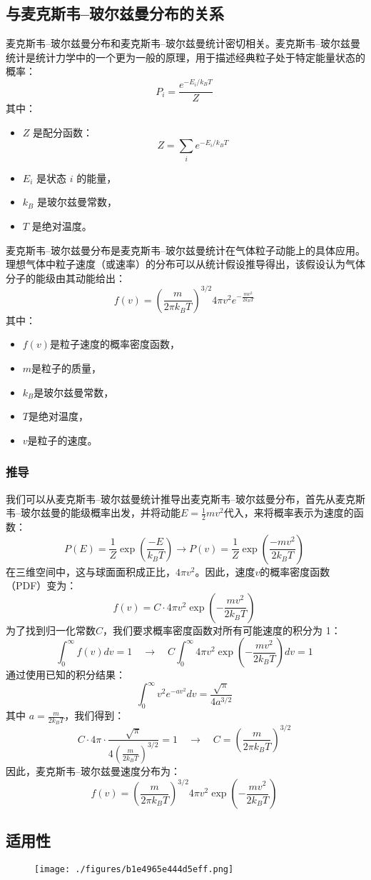 \subsection{与麦克斯韦–玻尔兹曼分布的关系}  
麦克斯韦–玻尔兹曼分布和麦克斯韦–玻尔兹曼统计密切相关。麦克斯韦–玻尔兹曼统计是统计力学中的一个更为一般的原理，用于描述经典粒子处于特定能量状态的概率：
\[
P_i = \frac{e^{-E_i / k_B T}}{Z}~
\]
其中：
\begin{itemize}
\item \( Z \) 是配分函数：
  \[
  Z = \sum_i e^{-E_i / k_B T}~
  \]
\item \( E_i \) 是状态 \( i \) 的能量，
\item \( k_B \) 是玻尔兹曼常数，
\item \( T \) 是绝对温度。
\end{itemize}
麦克斯韦–玻尔兹曼分布是麦克斯韦–玻尔兹曼统计在气体粒子动能上的具体应用。理想气体中粒子速度（或速率）的分布可以从统计假设推导得出，该假设认为气体分子的能级由其动能给出：
\[
f(v) = \left( \frac{m}{2 \pi k_B T} \right)^{3/2} 4 \pi v^2 e^{-\frac{m v^2}{2 k_B T}}~
\]
其中：
\begin{itemize}
\item \( f(v) \)是粒子速度的概率密度函数，
\item \( m \)是粒子的质量，
\item \( k_B \)是玻尔兹曼常数，
\item \( T \)是绝对温度，
\item \( v \)是粒子的速度。
\end{itemize}
\subsubsection{推导}
我们可以从麦克斯韦–玻尔兹曼统计推导出麦克斯韦–玻尔兹曼分布，首先从麦克斯韦–玻尔兹曼的能级概率出发，并将动能\( E = \frac{1}{2} m v^2 \)代入，来将概率表示为速度的函数：
\[
P(E) = \frac{1}{Z} \exp \left( \frac{-E}{k_B T} \right) \rightarrow P(v) = \frac{1}{Z} \exp \left( \frac{-m v^2}{2 k_B T} \right)~
\]
在三维空间中，这与球面面积成正比，\( 4 \pi v^2 \)。因此，速度\( v \)的概率密度函数（PDF）变为：
\[
f(v) = C \cdot 4 \pi v^2 \exp \left( -\frac{m v^2}{2 k_B T} \right)~
\]
为了找到归一化常数\( C \)，我们要求概率密度函数对所有可能速度的积分为 1：
\[
\int_0^\infty f(v) dv = 1 \quad \rightarrow \quad C \int_0^\infty 4 \pi v^2 \exp \left( -\frac{m v^2}{2 k_B T} \right) dv = 1~
\]
通过使用已知的积分结果：
\[
\int_0^\infty v^2 e^{-a v^2} dv = \frac{\sqrt{\pi}}{4 a^{3/2}}~
\]
其中 \( a = \frac{m}{2 k_B T} \)，我们得到：
\[
C \cdot 4 \pi \cdot \frac{\sqrt{\pi}}{4 \left( \frac{m}{2 k_B T} \right)^{3/2}} = 1 \quad \rightarrow \quad C = \left( \frac{m}{2 \pi k_B T} \right)^{3/2}~
\]
因此，麦克斯韦–玻尔兹曼速度分布为：
\[
f(v) = \left( \frac{m}{2 \pi k_B T} \right)^{3/2} 4 \pi v^2 \exp \left( -\frac{m v^2}{2 k_B T} \right)~
\]
\subsection{适用性}
\begin{figure}[ht]
\centering
\texttt{[image: ./figures/b1e4965e444d5eff.png]}
\caption{} \label{fig_MBTJ_2}
\end{figure}